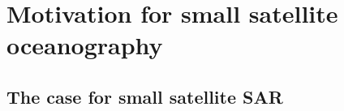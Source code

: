 %
%
%


\section{Motivation for small satellite oceanography}
\label{sec:Intro_Motivation}

{\small\textit{\lipsum[1-2]}}

\subsection{The case for small satellite SAR}

{\small\textit{\lipsum[1-2]}}


